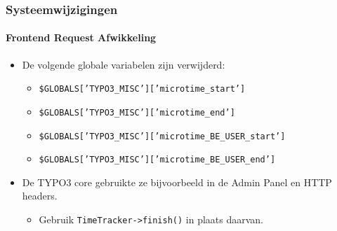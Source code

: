 \begin{frame}[fragile]
	\frametitle{Systeemwijzigingen}
	\framesubtitle{Frontend Request Afwikkeling}

	\lstset{basicstyle=\smaller\ttfamily}

	\begin{itemize}
		\item De volgende globale variabelen zijn verwijderd:

			\begin{itemize}
				\item \texttt{\$GLOBALS['TYPO3\_MISC']['microtime\_start']}
				\item \texttt{\$GLOBALS['TYPO3\_MISC']['microtime\_end']}
				\item \texttt{\$GLOBALS['TYPO3\_MISC']['microtime\_BE\_USER\_start']}
				\item \texttt{\$GLOBALS['TYPO3\_MISC']['microtime\_BE\_USER\_end']}
			\end{itemize}

		\item De TYPO3 core gebruikte ze bijvoorbeeld in de Admin Panel en HTTP headers.

			\begin{itemize}\smaller
				\item[\ding{228}] Gebruik \texttt{TimeTracker->finish()} in plaats daarvan.
			\end{itemize}\normalsize

	\end{itemize}

\end{frame}



